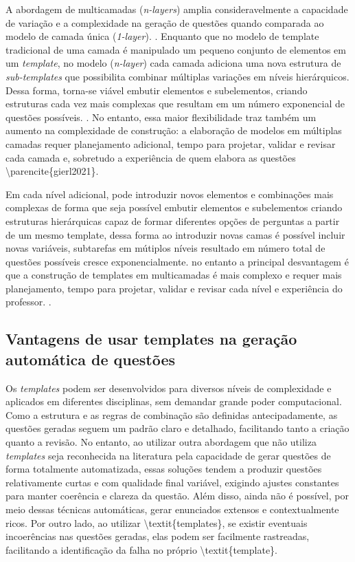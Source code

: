 A abordagem de multicamadas (\textit{n-layers}) amplia consideravelmente a capacidade de variação e a complexidade na geração de questões quando comparada ao modelo de camada única (\textit{1-layer}).  . Enquanto que no modelo de template tradicional de uma camada é manipulado um pequeno conjunto de elementos em um \textit{template}, no modelo (\textit{n-layer}) cada camada adiciona uma nova estrutura de \textit{sub-templates} que possibilita combinar múltiplas variações em níveis hierárquicos. Dessa forma, torna-se viável embutir elementos e subelementos, criando estruturas cada vez mais complexas que resultam em um número exponencial de questões possíveis.  \parencite{lai2013}. No entanto, essa maior flexibilidade traz também um aumento na complexidade de construção: a elaboração de modelos em múltiplas camadas requer planejamento adicional, tempo para projetar, validar e revisar cada camada e, sobretudo a experiência de quem elabora as questões \textbackslash{}parencite\{gierl2021\}. 


Em cada nível adicional, pode introduzir novos elementos e combinações mais complexas de forma que seja possível embutir elementos e subelementos criando estruturas hierárquicas capaz de formar diferentes opções de perguntas a partir de um mesmo template, dessa forma ao introduzir novas camas é possível incluir novas variáveis, subtarefas em mútiplos níveis resultado em número total de questões possíveis cresce exponencialmente. no entanto a principal desvantagem é que a construção de templates em multicamadas é mais complexo e requer mais planejamento, tempo para projetar, validar e revisar cada nível e experiência do professor. \parencite{gierl2021}. 


\subsection{Vantagens de usar templates na geração automática de questões}

Os \textit{templates} podem ser desenvolvidos para diversos níveis de complexidade e aplicados em diferentes disciplinas, sem demandar grande poder computacional. Como a estrutura e as regras de combinação são definidas antecipadamente, as questões geradas seguem um padrão claro e detalhado, facilitando tanto a criação quanto a revisão. No entanto,  ao utilizar outra abordagem que não utiliza \textit{templates} seja reconhecida na literatura pela capacidade de gerar questões de forma totalmente automatizada, essas soluções tendem a produzir questões relativamente curtas e com qualidade final variável, exigindo ajustes constantes para manter coerência e clareza da questão. Além disso, ainda não é possível, por meio dessas técnicas automáticas, gerar enunciados extensos e contextualmente ricos. Por outro lado, ao utilizar \textbackslash{}textit\{templates\},  se existir eventuais incoerências nas questões geradas, elas podem ser facilmente rastreadas, facilitando a identificação da falha no próprio \textbackslash{}textit\{template\}. 